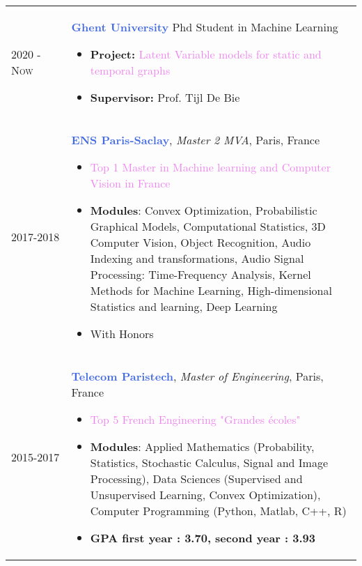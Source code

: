 \documentclass[a4paper,10pt]{article} %
\begin{document}
{\begin{tabular}{p{2cm}p{15cm}}

	\textsc{2020 - Now} & \textcolor{royalblue}{\textbf{Ghent University}} Phd Student in Machine Learning
	\begin{itemize}
		\item \textcolor{pinegreen}{\textbf{Project:}} \textcolor{violet}{Latent Variable models for static and temporal graphs} 
		\item \textcolor{pinegreen}{\textbf{Supervisor:}} Prof. Tijl De Bie 
	\end{itemize}                                                                                            \\


	\textsc{2017}-2018  & \textcolor{royalblue}{\textbf{ENS Paris-Saclay}}, \emph{Master 2 MVA}, Paris, France
	\begin{itemize}
		\item \textcolor{violet}{Top 1 Master in Machine learning and Computer Vision  in France}
		\item \textcolor{pinegreen}{\textbf{Modules}}: Convex Optimization, Probabilistic Graphical Models,
		      Computational Statistics, 3D Computer Vision, Object Recognition,
		      Audio Indexing and transformations, Audio Signal Processing:
		      Time-Frequency Analysis, Kernel Methods for Machine Learning,
		      High-dimensional Statistics and learning, Deep Learning
		\item With Honors
	\end{itemize}
	\\




	\textsc{2015}-2017  & \textcolor{royalblue}{\textbf{Telecom Paristech}}, \emph{Master of Engineering}, Paris, France
	\begin{itemize}
		\item \textcolor{violet}{Top 5 French Engineering "Grandes \'{e}coles"}
		\item \textcolor{pinegreen}{\textbf{Modules}}: Applied Mathematics (Probability, Statistics, Stochastic Calculus, Signal and Image Processing), Data Sciences (Supervised and Unsupervised Learning, Convex Optimization), Computer Programming (Python, Matlab, C++, R)
		\item \textbf{GPA first year : 3.70,  second year : 3.93}

	\end{itemize}
	\\


\end{tabular}}
\end{document}
